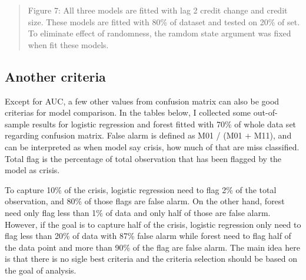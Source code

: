 \documentclass{article}
\newcommand{\ciapdf}[1]{\vspace*{-\parskip}\begin{center}\resizebox{0.75\textwidth}{!}{\texttt{[image: \#1]}}\end{center}}
\begin{document}
\ciapdf{Figure_11.pdf}
\begin{quote}
Figure 7: All three models are fitted with lag 2 credit change and
credit size. These models are fitted with 80\% of dataset and
tested on 20\% of set. To eliminate effect of randomness, the
ramdom state argument was fixed when fit these models.
\end{quote}

\subsection*{Another criteria}

Except for AUC, a few other values from confusion matrix can also be good
criterias for model comparison. In the tables below, I collected some 
out-of-sample results for logistic regression and forest fitted with 70\%
of whole data set regarding confusion matrix. False alarm is defined as
M01 / (M01 + M11), and can be interpreted as when model say crisis, how much
of that are miss classified. Total flag is the percentage of total
observation that has been flagged by the model as crisis.

To capture 10\% of the crisis,
logistic regression need to flag 2\% of the total observation, and 80\%
of those flags are false alarm. On the other hand, forest need only flag
less than 1\% of data and only half of those are false alarm. However,
if the goal is to capture half of the crisis, logistic regression only
need to flag less than 20\% of data with 87\% false alarm while forest
need to flag half of the data point and more than 90\% of the flag are
false alarm. The main idea here is that there is no sigle best criteria
and the criteria selection should be based on the goal of analysis.
\end{document}
